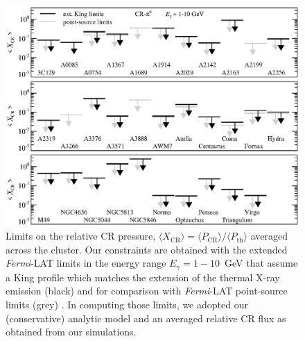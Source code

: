 \documentclass[10pt,aps,pra,reprint,amsmath,amsfonts,amssymb,showpacs,nofootinbib,floatfix]{revtex4-1}
\newcommand{\Fermi}{{\em Fermi}\xspace}
\newcommand{\rmn}{\mathrm}
\newcommand{\bra}{\langle}
\newcommand{\ket}{\rangle}
\begin{document}
\begin{figure}
\begin{minipage}{2.0\columnwidth}
  \includegraphics[width=0.99\columnwidth]{figures/XCR.Fermi.eps}
  \caption{Limits on the relative CR pressure, $\bra
    X_\rmn{CR}\ket = \bra P_\rmn{CR} \ket / \bra P_\rmn{th}\ket$
    averaged across the cluster. Our constraints are obtained with the
    extended \Fermi-LAT limits in the energy range $E_\gamma=1-10$~GeV
    that assume a King profile which matches the extension of the
    thermal X-ray emission (black) and for comparison with \Fermi-LAT
    point-source limits (grey) \cite{2010ApJ...717L..71A}. In
    computing those limits, we adopted our (conservative) analytic
    model \cite{2010MNRAS.409..449P} and an averaged relative CR flux
    as obtained from our simulations.}
 \label{fig:XCR}
\end{minipage}
\end{figure}
\end{document}
